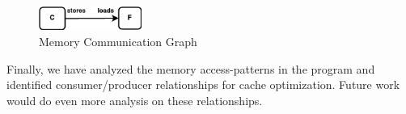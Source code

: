 \begin{figure}[h]
    \centering
    \includegraphics[width=0.3\textwidth]{mem_comm_dfg.png}
    \caption{Memory Communication Graph}
    \label{fig:mem_comm_dfg}
\end{figure}

Finally, we have analyzed the memory access-patterns in the program and identified consumer/producer relationships for cache optimization. Future work would do even more analysis on these relationships.